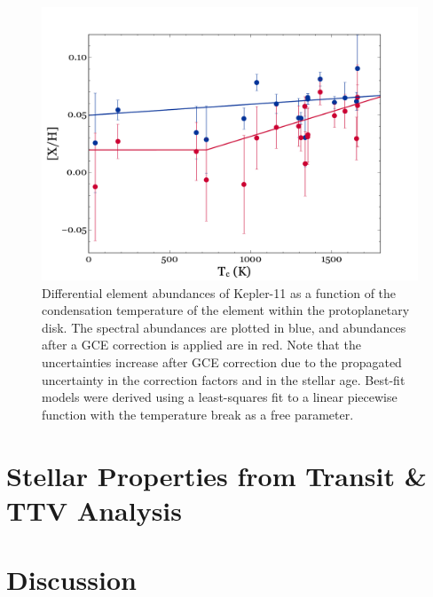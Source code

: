 \documentclass[oneside]{emulateapj}
\begin{document}
\begin{figure}
\centering
\includegraphics[scale=0.45]{K11_Tc_break}
\caption{Differential element abundances of Kepler-11 as a function of the condensation temperature of the element within the protoplanetary disk. The spectral abundances are plotted in blue, and abundances after a GCE correction is applied are in red. Note that the uncertainties increase after GCE correction due to the propagated uncertainty in the correction factors and in the stellar age. Best-fit models were derived using a least-squares fit to a linear piecewise function with the temperature break as a free parameter. }
\label{fig:tc}
\end{figure}




\section{Stellar Properties from Transit \& TTV Analysis}
\label{s:ttvs}


\begin{figure}
\centering
\caption{}
\label{fig:densities}
\end{figure}


\section{Discussion}
\label{s:discussion}
\end{document}
